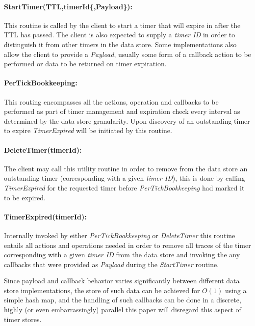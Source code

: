 \documentclass[twocolumn,a4paper]{article}
\begin{document}
\paragraph{StartTimer(TTL,timerId\{,Payload\}):} This routine is called by the client to start a timer that will expire in after the TTL has passed. The client is also expected to supply a \textit{timer ID} in order to distinguish it from other timers in the data store. Some implementations also allow the client to provide a \textit{Payload}, usually some form of a callback action to be performed or data to be returned on timer expiration.

\paragraph{PerTickBookkeeping:} This routing encompasses all the actions, operation and callbacks to be performed as part of timer management and  expiration check every interval as determined by the data store granularity. Upon discovery of an outstanding timer to expire \textit{TimerExpired} will be initiated by this routine.

\paragraph{DeleteTimer(timerId):} The client may call this utility routine in order to remove from the data store an outstanding timer (corresponding with a given \textit{timer ID}), this is done by calling \textit{TimerExpired} for the requested timer before \textit{PerTickBookkeeping} had marked it to be expired.

\paragraph{TimerExpired(timerId):} Internally invoked by either \textit{PerTickBookkeeping} or \textit{DeleteTimer} this routine entails all actions and operations needed in order to remove all traces of the timer corresponding with a given \textit{timer ID} from the data store and invoking the any callbacks that were provided as \textit{Payload} during the \textit{StartTimer} routine.

\vspace{5mm}

Since payload and callback behavior varies significantly between different data store implementations, the store of such data can be achieved for $ O(1) $ using a simple hash map, and the handling of such callbacks can be done in a discrete, highly (or even embarrassingly) parallel this paper will disregard this aspect of timer stores.
\end{document}
